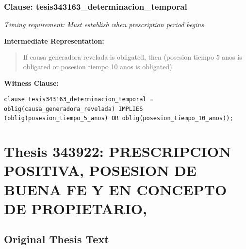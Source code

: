 \documentclass[11pt,a4paper]{article}
\begin{document}
\subsubsection{Clause: tesis343163\_determinacion\_temporal}

\textit{Timing requirement: Must establish when prescription period begins}

\textbf{Intermediate Representation:}

\begin{quote}
If causa generadora revelada is obligated, then (posesion tiempo 5 anos is obligated or posesion tiempo 10 anos is obligated)
\end{quote}

\textbf{Witness Clause:}

\begin{lstlisting}[style=witnessstyle, language=Witness]
clause tesis343163_determinacion_temporal = oblig(causa_generadora_revelada) IMPLIES (oblig(posesion_tiempo_5_anos) OR oblig(posesion_tiempo_10_anos));
\end{lstlisting}

\newpage

\section{Thesis 343922: PRESCRIPCION POSITIVA, POSESION DE BUENA FE Y EN CONCEPTO DE PROPIETARIO,}
\label{thesis:343922}

\subsection{Original Thesis Text}
\end{document}
